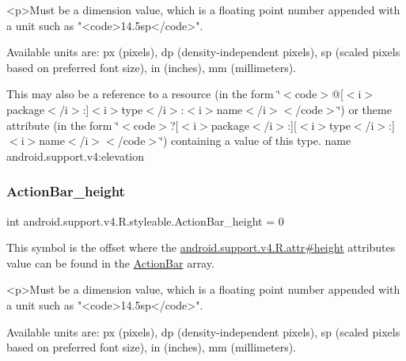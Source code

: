 \begin{DoxyVerb}      <p>Must be a dimension value, which is a floating point number appended with a unit such as "<code>14.5sp</code>".
\end{DoxyVerb}
 Available units are\+: px (pixels), dp (density-\/independent pixels), sp (scaled pixels based on preferred font size), in (inches), mm (millimeters). 

This may also be a reference to a resource (in the form \char`\"{}$<$code$>$@\mbox{[}$<$i$>$package$<$/i$>$\+:\mbox{]}$<$i$>$type$<$/i$>$\+:$<$i$>$name$<$/i$>$$<$/code$>$\char`\"{}) or theme attribute (in the form \char`\"{}$<$code$>$?\mbox{[}$<$i$>$package$<$/i$>$\+:\mbox{]}\mbox{[}$<$i$>$type$<$/i$>$\+:\mbox{]}$<$i$>$name$<$/i$>$$<$/code$>$\char`\"{}) containing a value of this type.  name android.\+support.\+v4\+:elevation \mbox{\label{classandroid_1_1support_1_1v4_1_1R_1_1styleable_a96d9c1a905653113d5071864c6cabc6f}} 
\subsubsection{\texorpdfstring{Action\+Bar\+\_\+height}{ActionBar\_height}}
{\footnotesize\ttfamily int android.\+support.\+v4.\+R.\+styleable.\+Action\+Bar\+\_\+height = 0\hspace{0.3cm}{\ttfamily [static]}}

This symbol is the offset where the \hyperlink{classandroid_1_1support_1_1v4_1_1R_1_1attr_a991d4e3217e3aec7fcb237693e406b04}{android.\+support.\+v4.\+R.\+attr\#height} attribute\textquotesingle{}s value can be found in the \hyperlink{classandroid_1_1support_1_1v4_1_1R_1_1styleable_adc5a3492b9c46265760d7120a04d6afa}{Action\+Bar} array.

\begin{DoxyVerb}      <p>Must be a dimension value, which is a floating point number appended with a unit such as "<code>14.5sp</code>".
\end{DoxyVerb}
 Available units are\+: px (pixels), dp (density-\/independent pixels), sp (scaled pixels based on preferred font size), in (inches), mm (millimeters). 

